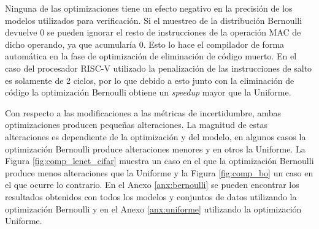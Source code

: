 Ninguna de las optimizaciones tiene un efecto negativo en la precisión de los modelos utilizados para verificación. Si el muestreo de la distribución Bernoulli devuelve 0 se pueden ignorar el resto de instrucciones de la operación MAC de dicho operando, ya que acumularía 0. Esto lo hace el compilador de forma automática en la fase de optimización de eliminación de código muerto. En el caso del procesador RISC-V utilizado la penalización de las instrucciones de salto es solamente de 2 ciclos, por lo que debido a esto junto con la eliminación de código la optimización Bernoulli obtiene un \textit{speedup} mayor que la Uniforme.

Con respecto a las modificaciones a las métricas de incertidumbre, ambas optimizaciones producen pequeñas alteraciones. La magnitud de estas alteraciones es dependiente de la optimización y del modelo, en algunos casos la optimización Bernoulli produce alteraciones menores y en otros la Uniforme. La Figura \ref{fig:comp_lenet_cifar} muestra un caso en el que la optimización Bernoulli produce menos alteraciones que la Uniforme y la Figura \ref{fig:comp_bo} un caso en el que ocurre lo contrario. En el Anexo \ref{anx:bernoulli} se pueden encontrar los resultados obtenidos con todos los modelos y conjuntos de datos utilizando la optimización Bernoulli y en el Anexo \ref{anx:uniforme} utilizando la optimización Uniforme.

